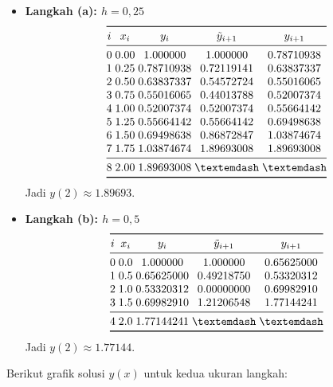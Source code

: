 \documentclass{article}
\begin{document}
\begin{enumerate}
\begin{itemize}
    \item {\bf Langkah (a): \(h = 0{,}25\)}  
        \[
        \begin{array}{@{}c@{\;}c@{\;}c@{\;}c@{\;}c@{}}
        \toprule
        i & x_i  & y_i        & \tilde y_{i+1} & y_{i+1}     \\
        \midrule
        0 & 0.00 & 1.000000   & 1.000000       & 0.78710938  \\
        1 & 0.25 & 0.78710938 & 0.72119141     & 0.63837337  \\
        2 & 0.50 & 0.63837337 & 0.54572724     & 0.55016065  \\
        3 & 0.75 & 0.55016065 & 0.44013788     & 0.52007374  \\
        4 & 1.00 & 0.52007374 & 0.52007374     & 0.55664142  \\
        5 & 1.25 & 0.55664142 & 0.55664142     & 0.69498638  \\
        6 & 1.50 & 0.69498638 & 0.86872847     & 1.03874674  \\
        7 & 1.75 & 1.03874674 & 1.89693008     & 1.89693008  \\
        \midrule
        8 & 2.00 & 1.89693008 & —              & —           \\
        \bottomrule
        \end{array}
        \]
        Jadi \(y(2)\approx1.89693\).

    \item {\bf Langkah (b): \(h = 0{,}5\)}  
        \[
        \begin{array}{@{}c@{\;}c@{\;}c@{\;}c@{\;}c@{}}
        \toprule
        i & x_i  & y_i        & \tilde y_{i+1} & y_{i+1}     \\
        \midrule
        0 & 0.0  & 1.000000   & 1.000000       & 0.65625000  \\
        1 & 0.5  & 0.65625000 & 0.49218750     & 0.53320312  \\
        2 & 1.0  & 0.53320312 & 0.00000000     & 0.69982910  \\
        3 & 1.5  & 0.69982910 & 1.21206548     & 1.77144241  \\
        \midrule
        4 & 2.0  & 1.77144241 & —              & —           \\
        \bottomrule
        \end{array}
        \]
        Jadi \(y(2)\approx1.77144\).

    \end{itemize}

    \bigskip
    \noindent Berikut grafik solusi \(y(x)\) untuk kedua ukuran langkah:


\end{enumerate}
\end{document}
